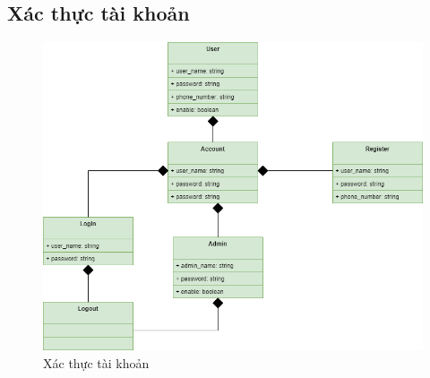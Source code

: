 \newpage
\subsection{Xác thực tài khoản}

\begin{figure}[!h]
    \begin{center}
        \includegraphics[scale=0.6]{Images/ClassDiagram/c_login.drawio.png}
    \end{center}
    \hspace{0.3cm}
    \caption{Xác thực tài khoản}
\end{figure}
